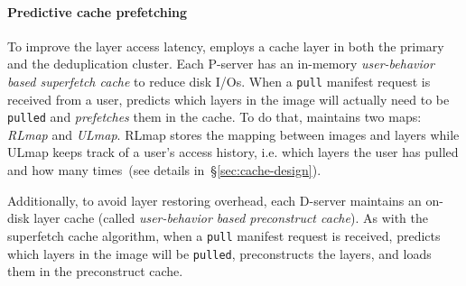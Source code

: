 \paragraph{Predictive cache prefetching}

To improve the layer access latency, \sysname employs a cache layer in both the
primary and the deduplication cluster.
%
Each P-server has an in-memory \emph{user-behavior based superfetch cache}
to reduce disk I/Os.
%
When a \texttt{pull} manifest request is received from a user,
\sysname predicts which layers in the image will actually need to be \texttt{pulled}
and \emph{prefetches} them in the cache.
To do that, \sysname maintains two maps: \emph{RLmap} and \emph{ULmap}. RLmap
stores the mapping between images and layers while ULmap keeps track of
a user's access history, i.e. which layers the user has pulled and how many
times~(see details in~\S\ref{sec:cache-design}).
%

Additionally, to avoid layer restoring overhead,
each D-server maintains an on-disk layer cache (called \emph{user-behavior based preconstruct cache}).
As with the superfetch cache algorithm,
when a \texttt{pull} manifest request is received,
\sysname predicts which layers in the image will be \texttt{pulled},
preconstructs the layers, and loads them in the preconstruct cache.
%


%
%
  
